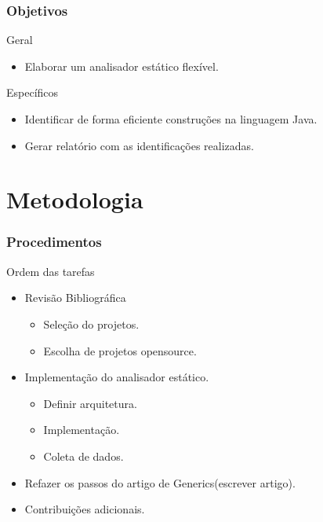 \documentclass[]{beamer}
\begin{document}
	
	\begin{frame}[fragile]\frametitle{Objetivos}
		\begin{block}{Geral}
			\begin{itemize}
				\item Elaborar um analisador estático flexível.
			\end{itemize}
		\end{block}
			
			\begin{block}{Específicos}
				\begin{itemize}
					\item Identificar de forma eficiente construções na linguagem Java.
					
					\item Gerar relatório com as identificações realizadas.
				\end{itemize}
			\end{block}
	\end{frame}
	
	\section{Metodologia}
	\begin{frame}[label=metodologia, fragile]
		\frametitle{Procedimentos}
		\begin{block}{Ordem das tarefas}
			\begin{itemize}
				\item Revisão Bibliográfica
					\begin{itemize}
						\item Seleção do projetos.
						\item Escolha de projetos opensource.
					\end{itemize}
				\item Implementação do analisador estático.
					\begin{itemize}
						\item Definir arquitetura.
						\item Implementação.
						\item Coleta de dados.
					\end{itemize}
					
				\item Refazer os passos do artigo de Generics(escrever artigo).
			
				\item Contribuições adicionais.
			\end{itemize}
		\end{block}
	\end{frame}
	
\end{document}
